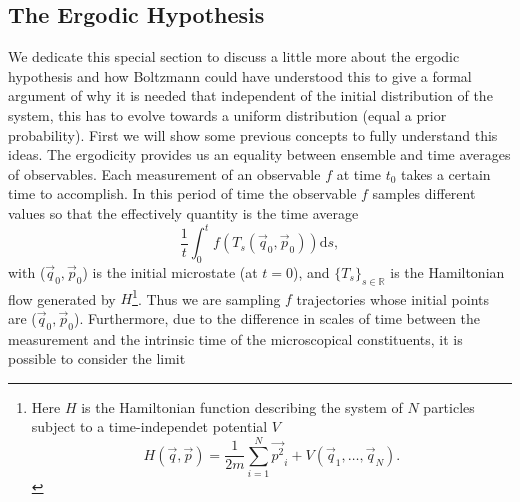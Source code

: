 \subsection{The Ergodic Hypothesis}
We dedicate this special section to discuss a little more about the ergodic hypothesis and how Boltzmann could have understood this to give a formal argument of  why it is needed that independent of the initial distribution of the system, this has to evolve towards a uniform distribution (equal a prior probability). First we will show some previous concepts to fully understand this ideas.
\newline
The ergodicity provides us an equality between ensemble and time averages of observables. Each measurement of an observable $f$ at time $t_0$ takes a certain time to accomplish. In this period of time the observable $f$ samples different values so that the effectively quantity is the time average
\begin{equation}
\frac{1}{t} \int_{0}^{t} f\left(T_{s}\left(\vec{q}_{0}, \vec{p}_{0}\right)\right) \mathrm{d} s,
\end{equation}
with ($\vec{q}_{0}, \vec{p}_{0}$) is the initial microstate (at $t=0$), and $\{T_s\}_{s\in \mathbb{R}}$ is the Hamiltonian flow generated by $H$\footnote{Here $H$ is the Hamiltonian function describing the system of $N$ particles subject to a time-independet potential $V$
\[H(\vec{q}, \vec{p})=\frac{1}{2 m} \sum_{i=1}^{N} \vec{p^{2}}_{i}+V\left(\vec{q}_{1}, \ldots, \vec{q}_{N}\right).\] }. Thus we are sampling $f$  trajectories whose initial points are ($\vec{q}_0, \vec{p}_0$). Furthermore, due to the difference in scales of time between the measurement and the intrinsic time of the microscopical constituents, it is possible to consider the limit

